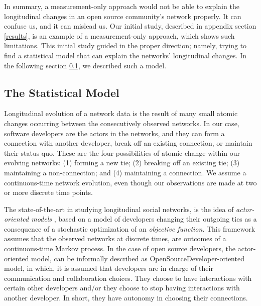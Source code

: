 \documentclass[11pt]{report}
\begin{document}
In summary, a measurement-only approach would not be able to explain the longitudinal changes in an open source community's network properly. It can confuse us, and it can mislead us. Our initial study, described in appendix section \ref{results}, is an example of a measurement-only approach, which shows such limitations. This initial study guided in the proper direction; namely, trying to find a statistical model that can explain the networks' longitudinal changes. In the following section \ref{statisticalModel}, we described such a model.  


%

\subsection{The Statistical Model}
\label{statisticalModel}

Longitudinal evolution of a network data is the result of many small atomic changes occurring between the consecutively observed networks. In our case, software developers are the actors in the networks, and they can form a connection with another developer, break off an existing connection, or maintain their status quo. These are the four possibilities of atomic change within our evolving networks: (1) forming a new tie; (2) breaking off an existing tie; (3) maintaining a non-connection; and (4) maintaining a connection. We assume a continuous-time network evolution, even though our observations are made at two or more discrete time points. 

The state-of-the-art in studying longitudinal social networks, is the idea of \textit{actor-oriented models} \cite{Snijders2010}, based on a model of developers changing their outgoing ties as a consequence of a stochastic optimization of an \textit{objective function}. This framework assumes that the observed networks at discrete times, are outcomes of a continuous-time Markov process. In the case of open source developers, the actor-oriented model, can be informally described as OpenSourceDeveloper-oriented model, in which, it is assumed that developers are in charge of their communication and collaboration choices. They choose to have interactions with certain other developers and/or they choose to stop having interactions with another developer. In short, they have autonomy in choosing their connections.
\end{document}
